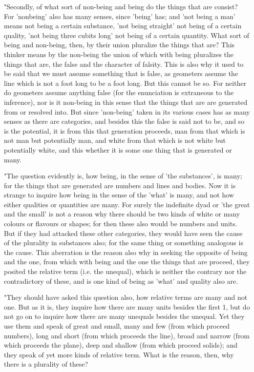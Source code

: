 "Secondly, of what sort of non-being and being do the things that
are consist? For 'nonbeing' also has many senses, since 'being' has;
and 'not being a man' means not being a certain substance, 'not being
straight' not being of a certain quality, 'not being three cubits
long' not being of a certain quantity. What sort of being and non-being,
then, by their union pluralize the things that are? This thinker means
by the non-being the union of which with being pluralizes the things
that are, the false and the character of falsity. This is also why
it used to be said that we must assume something that is false, as
geometers assume the line which is not a foot long to be a foot long.
But this cannot be so. For neither do geometers assume anything false
(for the enunciation is extraneous to the inference), nor is it non-being
in this sense that the things that are are generated from or resolved
into. But since 'non-being' taken in its various cases has as many
senses as there are categories, and besides this the false is said
not to be, and so is the potential, it is from this that generation
proceeds, man from that which is not man but potentially man, and
white from that which is not white but potentially white, and this
whether it is some one thing that is generated or many. 

"The question evidently is, how being, in the sense of 'the substances',
is many; for the things that are generated are numbers and lines and
bodies. Now it is strange to inquire how being in the sense of the
'what' is many, and not how either qualities or quantities are many.
For surely the indefinite dyad or 'the great and the small' is not
a reason why there should be two kinds of white or many colours or
flavours or shapes; for then these also would be numbers and units.
But if they had attacked these other categories, they would have seen
the cause of the plurality in substances also; for the same thing
or something analogous is the cause. This aberration is the reason
also why in seeking the opposite of being and the one, from which
with being and the one the things that are proceed, they posited the
relative term (i.e. the unequal), which is neither the contrary nor
the contradictory of these, and is one kind of being as 'what' and
quality also are. 

"They should have asked this question also, how relative terms are
many and not one. But as it is, they inquire how there are many units
besides the first 1, but do not go on to inquire how there are many
unequals besides the unequal. Yet they use them and speak of great
and small, many and few (from which proceed numbers), long and short
(from which proceeds the line), broad and narrow (from which proceeds
the plane), deep and shallow (from which proceed solids); and they
speak of yet more kinds of relative term. What is the reason, then,
why there is a plurality of these? 

